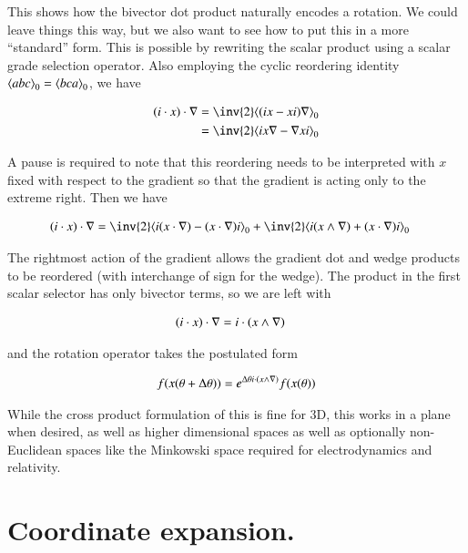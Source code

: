 This shows how the bivector dot product naturally encodes a rotation.  We could leave things this way, but we also want to see how to put this in a more ``standard'' form.  This is possible by rewriting the scalar product using a scalar grade selection operator.  Also employing the cyclic reordering identity ${\left\langle{{ a b c }}\right\rangle}_{0} = {\left\langle{{ b c a}}\right\rangle}_{0}$, we have

\begin{align*}
( i \cdot x) \cdot \grad
&=
\inv{2} \gpgradezero{ ( i x - x i) \grad } \\
&=
\inv{2} \gpgradezero{ i x \grad - \grad x i } \\
\end{align*}

A pause is required to note that this reordering needs to be interpreted with $x$ fixed with respect to the gradient so that the gradient is acting only to the extreme right.  Then we have

\begin{align}\label{eqn:rotationGen:foo17}
( i \cdot x) \cdot \grad
&=
\inv{2} \gpgradezero{ i (x \cdot \grad) - (x \cdot \grad) i } + \inv{2} \gpgradezero{ i (x \wedge \grad) + (x \cdot \grad) i } 
\end{align}

The rightmost action of the gradient allows the gradient dot and wedge products to be reordered (with interchange of sign for the wedge).  The product in the first scalar selector has only bivector terms, so we are left with

\begin{align}\label{eqn:rotationGen:foo18}
( i \cdot x) \cdot \nabla
&=
i \cdot (x \wedge \nabla)
\end{align}

and the rotation operator takes the postulated form

\begin{align}\label{eqn:rotationGen:foo19}
f(x(\theta + \Delta\theta)) = e^{\Delta\theta i \cdot (x \wedge \nabla)} f(x(\theta))
\end{align}

While the cross product formulation of this is fine for 3D, this works in a plane when desired, as well as higher dimensional spaces as well as optionally non-Euclidean spaces like the Minkowski space required for electrodynamics and relativity.

\section{Coordinate expansion.}

